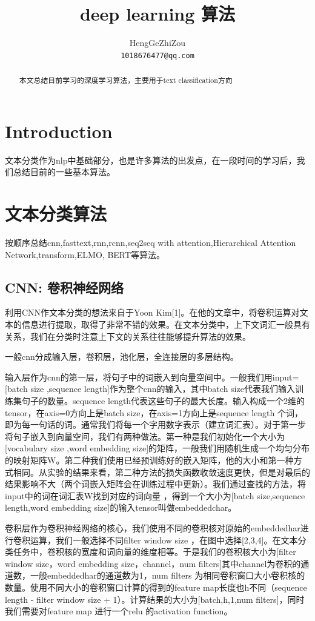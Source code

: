 \documentclass{article}
\title{deep learning 算法}
\author{
  HengGeZhiZou\\
  \texttt{1018676477@qq.com} \\
}
\begin{document}
\maketitle

\begin{abstract}
本文总结目前学习的深度学习算法，主要用于text classification方向
\end{abstract}


\section{Introduction}

文本分类作为nlp中基础部分，也是许多算法的出发点，在一段时间的学习后，我们总结目前的一些基本算法。

\section{文本分类算法}
按顺序总结cnn,fasttext,rnn,rcnn,seq2seq with attention,Hierarchical Attention Network,transform,ELMO,
BERT等算法。


\subsection{CNN: 卷积神经网络 }
利用CNN作文本分类的想法来自于Yoon Kim[1]。在他的文章中，将卷积运算对文本的信息进行提取，取得了非常不错的效果。在文本分类中，上下文词汇一般具有关系，我们在分类时注意上下文的关系往往能够提升算法的效果。

一般cnn分成输入层，卷积层，池化层，全连接层的多层结构。

输入层作为cnn的第一层，将句子中的词嵌入到向量空间中。一般我们用input=[batch size ,sequence length]作为整个cnn的输入，其中batch size代表我们输入训练集句子的数量。sequence length代表这些句子的最大长度。输入构成一个2维的tensor，在axis=0方向上是batch size，在axis=1方向上是sequence length 个词，即为每一句话的词。通常我们将每一个字用数字表示（建立词汇表）。对于第一步将句子嵌入到向量空间，我们有两种做法。第一种是我们初始化一个大小为[vocabulary size ,word embedding size]的矩阵，一般我们用随机生成一个均匀分布的映射矩阵W。第二种我们使用已经预训练好的嵌入矩阵，他的大小和第一种方式相同。从实验的结果来看，第二种方法的损失函数收敛速度更快，但是对最后的结果影响不大（两个词嵌入矩阵会在训练过程中更新）。我们通过查找的方法，将input中的词在词汇表W找到对应的词向量
，得到一个大小为[batch size,sequence length,word embedding size]的输入tensor叫做embeddedchar。

卷积层作为卷积神经网络的核心，我们使用不同的卷积核对原始的embeddedhar进行卷积运算，我们一般选择不同filter window size ，在图中选择[2,3,4]。在文本分类任务中，卷积核的宽度和词向量的维度相等。于是我们的卷积核大小为[filter window size，word embedding size，channel，num filters]其中channel为卷积的通道数，一般embeddedhar的通道数为1，num filters 为相同卷积窗口大小卷积核的数量。使用不同大小的卷积窗口计算的得到的feature map长度也h不同（sequence length - filter window size + 1）。计算结果的大小为[batch,h,1,num filters]，同时我们需要对feature map 进行一个relu 的activation function。
\end{document}
